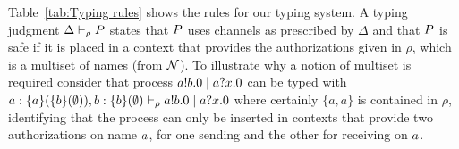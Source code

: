  

 




Table~\ref{tab:Typing rules} shows the rules for our typing system. A typing judgment
$
    \Delta\vdash_\rho P
$
 states that $P$ uses channels as prescribed by $\Delta$ and that $P$ is safe if it is placed in a context that provides the authorizations given in $\rho$, which is a multiset of names (from ${\cal N}$). 
To illustrate why a notion of multiset is required consider that process  
 $ a!b.0 \;|\; a?x.0$ can be typed with
 $
   a:\{a\}(\{b\}(\emptyset)), b: \{b\}(\emptyset)\vdash_{\rho} a!b.0 \;|\; a?x.0
 $
 where certainly  $\{a,a\}$ is contained in $\rho$, identifying that the process can only be inserted in contexts that provide two authorizations on name $a$, for one sending and the other for receiving on $a$.

 

%

